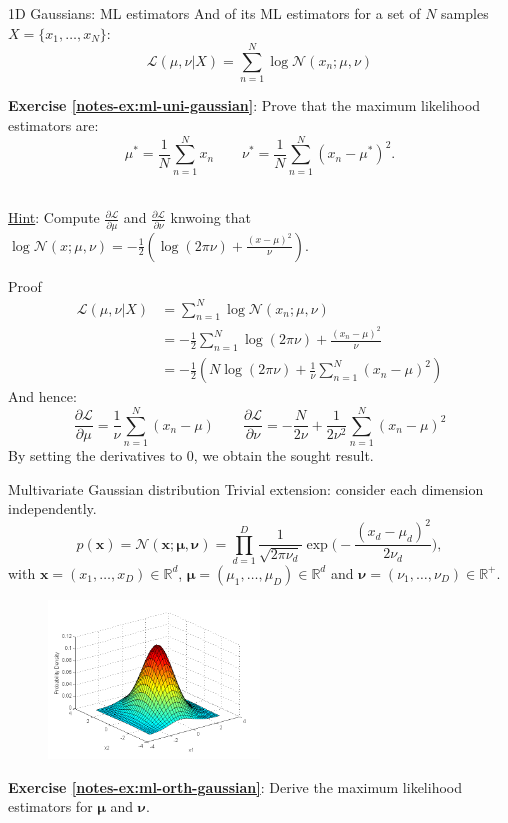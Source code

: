 \documentclass{beamer}
\newcommand{\bs}[1]{\boldsymbol{#1}}
\newcommand{\exercise}[2]{\noindent\colorbox{blue!10}{\parbox{0.995\textwidth}{\textbf{Exercise \ref{notes-ex:#1}}: #2}}\\}
\begin{document}
\begin{frame}{1D Gaussians: ML estimators}
And of its ML estimators for a set of $N$ samples $X=\{x_1,\ldots,x_N\}$:
\[\mathcal{L}(\mu,\nu|X) = \sum_{n=1}^N \log \mathcal{N}(x_n;\mu,\nu)\]
\exercise{ml-uni-gaussian}{Prove that the maximum likelihood estimators are:
\[ \mu^* = \frac{1}{N}\sum_{n=1}^N x_n \qquad \nu^*=\frac{1}{N}\sum_{n=1}^N (x_n-\mu^*)^2.\]}\vspace{3mm}
\underline{Hint}: Compute $\displaystyle\frac{\partial\mathcal{L}}{\partial\mu}$ and $\displaystyle\frac{\partial\mathcal{L}}{\partial\nu}$ knwoing that $ \log \mathcal{N}(x;\mu,\nu) = -\frac{1}{2}\left(\log(2\pi\nu) + \frac{(x-\mu)^2}{\nu}\right) $.
\end{frame}

\begin{frame}{Proof}
 \begin{align*}
  \mathcal{L}(\mu,\nu|X) &= \sum_{n=1}^N \log \mathcal{N}(x_n;\mu,\nu) \\
  &= -\frac{1}{2}\sum_{n=1}^N \log(2\pi\nu) + \frac{(x_n-\mu)^2}{\nu} \\
  &= -\frac{1}{2}\left(N\log(2\pi\nu) + \frac{1}{\nu}\sum_{n=1}^N(x_n-\mu)^2\right)
 \end{align*}
And hence:
\[\frac{\partial\mathcal{L}}{\partial\mu}=\frac{1}{\nu}\sum_{n=1}^N(x_n-\mu) \qquad \frac{\partial\mathcal{L}}{\partial\nu}=-\frac{N}{2\nu} + \frac{1}{2\nu^2}\sum_{n=1}^N(x_n-\mu)^2\]
By setting the derivatives to 0, we obtain the sought result.
\end{frame}
 
\begin{frame}{Multivariate Gaussian distribution}
Trivial extension: consider each dimension independently.
 \[p(\mathbf{x}) = \mathcal{N}(\mathbf{x};\bs{\mu},\bs{\nu}) = \prod_{d=1}^D\frac{1}{\sqrt{2\pi\nu_d}}\exp\Big(-\frac{(x_d-\mu_d)^2}{2\nu_d}\Big),\]
{\small with $\mathbf{x}=(x_1,\ldots,x_D)\in\mathbb{R}^d$, $\bs{\mu}=(\mu_1,\ldots,\mu_D)\in\mathbb{R}^d$ and $\bs{\nu}=(\nu_1,\ldots,\nu_D)\in\mathbb{R}^{+}$.}
\begin{figure}
 \centering
 \includegraphics[width=0.5\textwidth]{fig/multivariate_gaussian}
\end{figure}
\exercise{ml-orth-gaussian}{Derive the maximum likelihood estimators for $\bs{\mu}$ and $\bs{\nu}$.} 
\end{frame}
\end{document}
